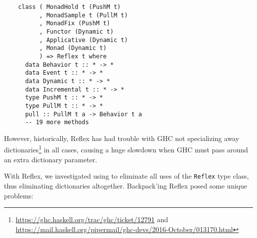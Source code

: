 \begin{lstlisting}
    class ( MonadHold t (PushM t)
          , MonadSample t (PullM t)
          , MonadFix (PushM t)
          , Functor (Dynamic t)
          , Applicative (Dynamic t)
          , Monad (Dynamic t)
          ) => Reflex t where
      data Behavior t :: * -> *
      data Event t :: * -> *
      data Dynamic t :: * -> *
      data Incremental t :: * -> *
      type PushM t :: * -> *
      type PullM t :: * -> *
      pull :: PullM t a -> Behavior t a
      -- 19 more methods
\end{lstlisting}
%
However, historically, Reflex has had trouble with GHC not
specializing away dictionaries\footnote{\url{https://ghc.haskell.org/trac/ghc/ticket/12791}
and \url{https://mail.haskell.org/pipermail/ghc-devs/2016-October/013170.html}}
in all cases, causing a huge slowdown when GHC must pass around
an extra dictionary parameter.

With Reflex, we investigated using \Backpack{} to eliminate all uses of
the \verb|Reflex| type class, thus eliminating dictionaries altogether.
Backpack'ing Reflex posed some unique problems:

